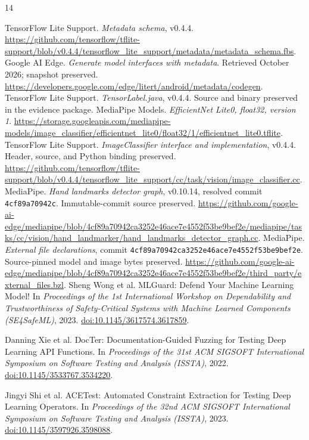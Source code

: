 \documentclass[10pt,twocolumn,letterpaper]{article}
\newcommand{\code}[1]{\texttt{#1}}
\begin{document}
\begin{thebibliography}{14}\small\raggedright
{} TensorFlow Lite Support. \emph{Metadata schema}, v0.4.4. \url{https://github.com/tensorflow/tflite-support/blob/v0.4.4/tensorflow_lite_support/metadata/metadata_schema.fbs}.
 Google AI Edge. \emph{Generate model interfaces with metadata}. Retrieved October 2026; snapshot preserved. \url{https://developers.google.com/edge/litert/android/metadata/codegen}.
 TensorFlow Lite Support. \emph{TensorLabel.java}, v0.4.4. Source and binary preserved in the evidence package.
 MediaPipe Models. \emph{EfficientNet Lite0, float32, version 1}. \url{https://storage.googleapis.com/mediapipe-models/image_classifier/efficientnet_lite0/float32/1/efficientnet_lite0.tflite}.
 TensorFlow Lite Support. \emph{ImageClassifier interface and implementation}, v0.4.4. Header, source, and Python binding preserved. \url{https://github.com/tensorflow/tflite-support/blob/v0.4.4/tensorflow_lite_support/cc/task/vision/image_classifier.cc}.
 MediaPipe. \emph{Hand landmarks detector graph}, v0.10.14, resolved commit \code{4cf89a70942c}. Immutable-commit source preserved. \url{https://github.com/google-ai-edge/mediapipe/blob/4cf89a70942ca3252e46ace7e4552f53be9bef2e/mediapipe/tasks/cc/vision/hand_landmarker/hand_landmarks_detector_graph.cc}.
 MediaPipe. \emph{External file declarations}, commit \code{4cf89a70942ca3252e46ace7e4552f53be9bef2e}. Source-pinned model and image bytes preserved. \url{https://github.com/google-ai-edge/mediapipe/blob/4cf89a70942ca3252e46ace7e4552f53be9bef2e/third_party/external_files.bzl}.
 Sheng Wong et al. MLGuard: Defend Your Machine Learning Model! In \emph{Proceedings of the 1st International Workshop on Dependability and Trustworthiness of Safety-Critical Systems with Machine Learned Components (SE4SafeML)}, 2023. \href{https://doi.org/10.1145/3617574.3617859}{doi:10.1145/3617574.3617859}.

 Danning Xie et al. DocTer: Documentation-Guided Fuzzing for Testing Deep Learning API Functions. In \emph{Proceedings of the 31st ACM SIGSOFT International Symposium on Software Testing and Analysis (ISSTA)}, 2022. \href{https://doi.org/10.1145/3533767.3534220}{doi:10.1145/3533767.3534220}.

 Jingyi Shi et al. ACETest: Automated Constraint Extraction for Testing Deep Learning Operators. In \emph{Proceedings of the 32nd ACM SIGSOFT International Symposium on Software Testing and Analysis (ISSTA)}, 2023. \href{https://doi.org/10.1145/3597926.3598088}{doi:10.1145/3597926.3598088}.


\end{thebibliography}
\end{document}
